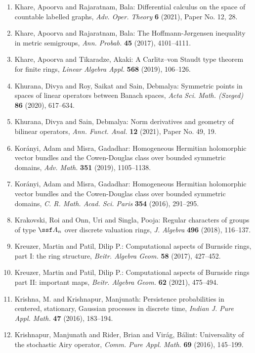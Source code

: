 \begin{enumerate}
\item Khare, Apoorva and Rajaratnam, Bala: Differential calculus on the space of countable labelled
graphs, \emph{Adv. Oper. Theory} {\bf 6} (2021), Paper No. 12, 28.
\item Khare, Apoorva and Rajaratnam, Bala: The {H}offmann-{J}\o rgensen inequality in metric semigroups, \emph{Ann. Probab.} {\bf 45} (2017), 4101--4111.
\item Khare, Apoorva and Tikaradze, Akaki: A {C}arlitz--von {S}taudt type theorem for finite rings, \emph{Linear Algebra Appl.} {\bf 568} (2019), 106--126.
\item Khurana, Divya and Roy, Saikat and Sain, Debmalya: Symmetric points in spaces of linear operators between
{B}anach spaces, \emph{Acta Sci. Math. (Szeged)} {\bf 86} (2020), 617--634.
\item Khurana, Divya and Sain, Debmalya: Norm derivatives and geometry of bilinear operators, \emph{Ann. Funct. Anal.} {\bf 12} (2021), Paper No. 49, 19.
\item Kor\'{a}nyi, Adam and Misra, Gadadhar: Homogeneous {H}ermitian holomorphic vector bundles and the
{C}owen-{D}ouglas class over bounded symmetric domains, \emph{Adv. Math.} {\bf 351} (2019), 1105--1138.
\item Kor\'{a}nyi, Adam and Misra, Gadadhar: Homogeneous {H}ermitian holomorphic vector bundles and the
{C}owen-{D}ouglas class over bounded symmetric domains, \emph{C. R. Math. Acad. Sci. Paris} {\bf 354} (2016), 291--295.
\item Krakovski, Roi and Onn, Uri and Singla, Pooja: Regular characters of groups of type {$\ssf A_n$} over
discrete valuation rings, \emph{J. Algebra} {\bf 496} (2018), 116--137.
\item Kreuzer, Martin and Patil, Dilip P.: Computational aspects of {B}urnside rings, part {I}: the ring
structure, \emph{Beitr. Algebra Geom.} {\bf 58} (2017), 427--452.
\item Kreuzer, Martin and Patil, Dilip P.: Computational aspects of {B}urnside rings part {II}: important
maps, \emph{Beitr. Algebra Geom.} {\bf 62} (2021), 475--494.
\item Krishna, M. and Krishnapur, Manjunath: Persistence probabilities in centered, stationary, {G}aussian
processes in discrete time, \emph{Indian J. Pure Appl. Math.} {\bf 47} (2016), 183--194.
\item Krishnapur, Manjunath and Rider, Brian and Vir\'{a}g, B\'{a}lint: Universality of the stochastic {A}iry operator, \emph{Comm. Pure Appl. Math.} {\bf 69} (2016), 145--199.

\end{enumerate}
